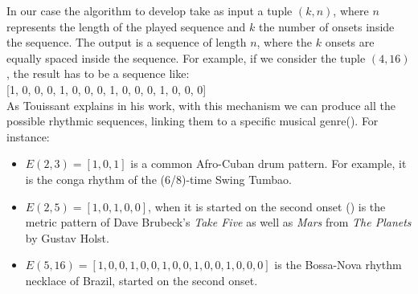 \documentclass[main.tex]{subfiles}
\begin{document}
In our case the algorithm to develop take as input a tuple \begin{math}{(k, n)}\end{math}, where \begin{math}{n}\end{math} represents the length of the played sequence and \begin{math}{k}\end{math} the number of onsets inside the sequence. The output is a sequence of length \begin{math}{n}\end{math}, where the \begin{math}{k}\end{math} onsets are equally spaced inside the sequence. For example, if we consider the tuple \begin{math}{(4, 16)}\end{math}, the result has to be a sequence like:\\
[2mm]
[1, 0, 0, 0, 1, 0, 0, 0, 1, 0, 0, 0, 1, 0, 0, 0]\\
[3mm]
As Touissant explains in his work\cite{Toussaint:2004:euclidean:rhythm}, with this mechanism we can produce all the possible rhythmic sequences, linking them to a specific musical genre(). For instance:
\begin{itemize}[noitemsep]
\item \begin{math}E(2,3)=[1,0,1]\end{math} is a common Afro-Cuban drum pattern. For example, it is the conga rhythm of the (6/8)-time Swing Tumbao\cite{Klower:1997}.
\item \begin{math}E(2,5)=[1,0,1,0,0]\end{math}, when it is started on the second onset (\begin{math}[1,0,0,1,0]\end{math}) is the metric pattern of Dave Brubeck’s \textit{Take Five} as well as \textit{Mars} from \textit{The Planets} by Gustav Holst\cite{Keith:1991}.
\item \begin{math}E(5,16)=[1,0,0,1,0,0,1,0,0,1,0,0,1,0,0,0]\end{math} is the Bossa-Nova rhythm necklace of Brazil, started on the second onset\cite{Behague:1973}.
\end{itemize}
\end{document}
